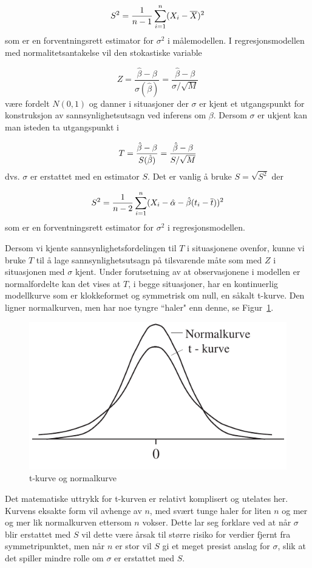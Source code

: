 \[   S^2={1\over n-1} \sum_{i=1}^n (X_i -\bar X)^2\]
som er en forventningsrett estimator for $\sigma ^2$ i
målemodellen. I regresjonsmodellen med normalitetsantakelse
vil den stokastiske variable

\[  Z=\frac{\hat{\beta}-\beta}{\sigma (\hat{\beta})}=
       \frac{\hat{\beta} - \beta}{\sigma /\sqrt M}\]
være fordelt $N(0,1)$ og danner i situasjoner der $\sigma$ er
kjent et utgangspunkt for konstruksjon av sannsynlighetsutsagn
ved inferens om $\beta$. Dersom $\sigma$ er ukjent kan man
isteden ta utgangspunkt i

\[T={\hat{\beta} -\beta \over S(\hat\beta)}={\hat\beta -
                                     \beta\over S/ \sqrt{M}}\]
dvs. $\sigma$ er erstattet med en estimator $S$. Det er vanlig
å bruke $S=\sqrt{S^2}$ der

\[S^2={1\over n-2} \sum_{i=1}^n (X_i -\hat\alpha-
                              \hat\beta(t_i -\bar t))^2\]
som er en forventningsrett estimator for $\sigma ^2$ i
regresjonsmodellen.

Dersom vi kjente sannsynlighetsfordelingen
til $T$ i situasjonene ovenfor, kunne vi bruke $T$ til å lage
sannsynlighetsutsagn på tilsvarende måte som med $Z$ i
situasjonen med $\sigma$ kjent.  Under forutsetning av at observasjonene
i modellen er normalfordelte kan det vises at $T$, i begge situasjoner,
har en kontinuerlig modellkurve som er klokkeformet og
symmetrisk om null, en såkalt t-kurve. Den ligner 
normalkurven, men har noe tyngre ``haler" enn denne, se Figur~\ref{fig:t_kurve}.

\begin{figure}[ht]
\centering
	\includegraphics[scale=1.0]{figurer/fig8_6.pdf} 
 \caption{t-kurve og normalkurve}
	\label{fig:t_kurve}
\end{figure}
Det matematiske uttrykk for t-kurven er relativt komplisert og
utelates her. Kurvens eksakte form vil avhenge av $n$, med
svært tunge haler for liten $n$ og mer og mer lik
normalkurven ettersom $n$ vokser. Dette lar seg forklare ved at
når $\sigma$ blir erstattet med $S$ vil dette være årsak 
til større risiko for verdier fjernt fra symmetripunktet, men
når $n$ er stor vil $S$ gi et meget presist anslag for
$\sigma$, slik at det spiller mindre rolle om $\sigma$ er
erstattet med $S$.

